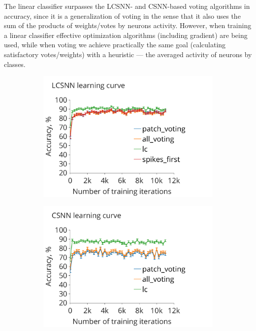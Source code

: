 \documentclass[a4paper,10pt]{article}
\begin{document}
The linear classifier surpasses the LCSNN- and CSNN-based voting algorithms in accuracy, since it is a generalization of voting in the sense that it also uses the sum of the products of weights/votes by neurons activity. However, when training a linear classifier effective optimization algorithms (including gradient) are being used, while when voting we achieve practically the same goal (calculating satisfactory votes/weights) with a heuristic --- the averaged activity of neurons by classes.

\begin{figure}
\begin{subfigure}{0.49\textwidth}
    \includegraphics[width=\textwidth,keepaspectratio=true]{LCSNN_learning_rate.pdf}
 \caption{}
 \label{LCSNN_learning_curve}
\end{subfigure}
\begin{subfigure}{0.49\textwidth} 
    \includegraphics[width=\textwidth,keepaspectratio=true]{CSNN_learning_rate.pdf}

\end{subfigure}
\end{figure}
\end{document}
